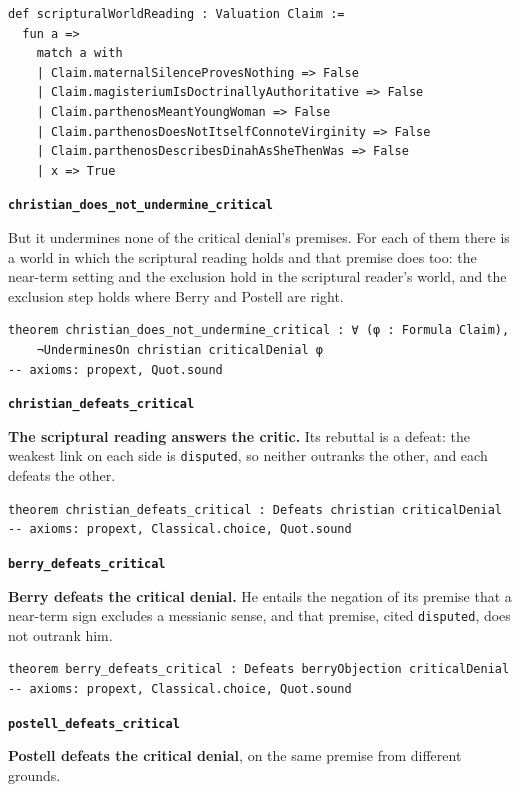 \documentclass[11pt]{article}
\begin{document}
{\small\begin{verbatim}
def scripturalWorldReading : Valuation Claim :=
  fun a =>
    match a with
    | Claim.maternalSilenceProvesNothing => False
    | Claim.magisteriumIsDoctrinallyAuthoritative => False
    | Claim.parthenosMeantYoungWoman => False
    | Claim.parthenosDoesNotItselfConnoteVirginity => False
    | Claim.parthenosDescribesDinahAsSheThenWas => False
    | x => True
\end{verbatim}}
\par\medskip\noindent\textbf{\texttt{christian\_\allowbreak{}does\_\allowbreak{}not\_\allowbreak{}undermine\_\allowbreak{}critical}}\par\nobreak\noindent
But it undermines none of the critical denial’s premises. For each of them there is a world in which the scriptural reading holds and that premise does too: the near-term setting and the exclusion hold in the scriptural reader’s world, and the exclusion step holds where Berry and Postell are right.

{\small\begin{verbatim}
theorem christian_does_not_undermine_critical : ∀ (φ : Formula Claim),
    ¬UnderminesOn christian criticalDenial φ
-- axioms: propext, Quot.sound
\end{verbatim}}
\par\medskip\noindent\textbf{\texttt{christian\_\allowbreak{}defeats\_\allowbreak{}critical}}\par\nobreak\noindent
\textbf{The scriptural reading answers the critic.} Its rebuttal is a defeat: the weakest link on each side is \texttt{disputed}, so neither outranks the other, and each defeats the other.

{\small\begin{verbatim}
theorem christian_defeats_critical : Defeats christian criticalDenial
-- axioms: propext, Classical.choice, Quot.sound
\end{verbatim}}
\par\medskip\noindent\textbf{\texttt{berry\_\allowbreak{}defeats\_\allowbreak{}critical}}\par\nobreak\noindent
\textbf{Berry defeats the critical denial.} He entails the negation of its premise that a near-term sign excludes a messianic sense, and that premise, cited \texttt{disputed}, does not outrank him.

{\small\begin{verbatim}
theorem berry_defeats_critical : Defeats berryObjection criticalDenial
-- axioms: propext, Classical.choice, Quot.sound
\end{verbatim}}
\par\medskip\noindent\textbf{\texttt{postell\_\allowbreak{}defeats\_\allowbreak{}critical}}\par\nobreak\noindent
\textbf{Postell defeats the critical denial}, on the same premise from different grounds.
\end{document}
